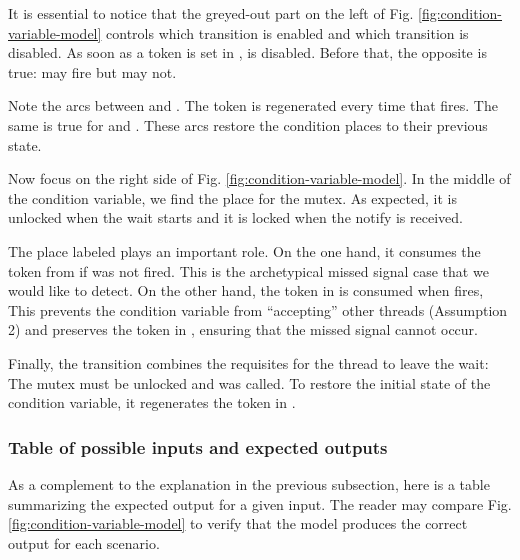 It is essential to notice that the greyed-out part
on the left of Fig. \ref{fig:condition-variable-model}
controls which transition is enabled and which transition is disabled.
As soon as a token is set in ,  is disabled.
Before that, the opposite is true:  may fire but  may not.

Note the arcs between  and .
The token is regenerated every time that  fires.
The same is true for  and .
These arcs restore the condition places to their previous state.

Now focus on the right side of Fig. \ref{fig:condition-variable-model}.
In the middle of the condition variable, we find the place for the mutex.
As expected, it is unlocked when the wait starts
and it is locked when the notify is received.

The place labeled  plays an important role.
On the one hand, it consumes the token from 
if  was not fired.
This is the archetypical missed signal case that we would like to detect.
On the other hand, the token in 
is consumed when  fires,
This prevents the condition variable from ``accepting'' other threads (Assumption 2)
and preserves the token in , ensuring that the missed signal cannot occur.

Finally, the  transition combines the requisites
for the thread to leave the wait: The mutex must be unlocked and  was called.
To restore the initial state of the condition variable,
it regenerates the token in .

\subsubsection{Table of possible inputs and expected outputs}

As a complement to the explanation in the previous subsection,
here is a table summarizing the expected output for a given input.
The reader may compare Fig. \ref{fig:condition-variable-model} to verify that
the model produces the correct output for each scenario.

